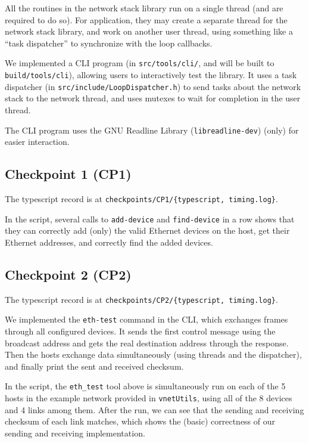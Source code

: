 \documentclass[a4paper]{article}
\begin{document}
  All the routines in the network stack library run on a single thread (and are required to do so).
  For application, they may create a separate thread for the network stack library, and work on another user thread, using something like a ``task dispatcher'' to synchronize with the loop callbacks.
  
  We implemented a CLI program (in \texttt{src/tools/cli/}, and will be built to \texttt{build/tools/cli}), allowing users to interactively test the library.
  It uses a task dispatcher (in \texttt{src/include/LoopDispatcher.h}) to send tasks about the network stack to the network thread, and uses mutexes to wait for completion in the user thread.

  The CLI program uses the GNU Readline Library (\texttt{libreadline-dev}) (only) for easier interaction.

  \subsection{Checkpoint 1 (CP1)}
  
  The typescript record is at \texttt{checkpoints/CP1/\{typescript, timing.log\}}.

  In the script, several calls to \texttt{add-device} and \texttt{find-device} in a row shows that they can correctly add (only) the valid Ethernet devices on the host, get their Ethernet addresses, and correctly find the added devices.

  \subsection{Checkpoint 2 (CP2)}

  The typescript record is at \texttt{checkpoints/CP2/\{typescript, timing.log\}}.

  We implemented the \texttt{eth-test} command in the CLI, which exchanges frames through all configured devices.
  It sends the first control message using the broadcast address and gets the real destination address through the response.
  Then the hosts exchange data simultaneously (using threads and the dispatcher), and finally print the sent and received checksum.

  In the script, the \texttt{eth\_test} tool above is simultaneously run on each of the 5 hosts in the example network provided in \texttt{vnetUtils}, using all of the 8 devices and 4 links among them.
  After the run, we can see that the sending and receiving checksum of each link matches, which shows the (basic) correctness of our sending and receiving implementation.
\end{document}
